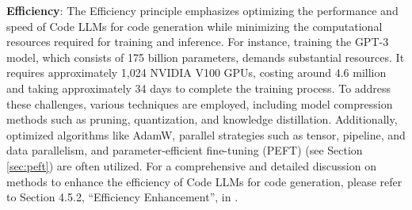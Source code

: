 \textbf{Efficiency}: 
The Efficiency principle emphasizes optimizing the performance and speed of Code LLMs for code generation while minimizing the computational resources required for training and inference. 
For instance, training the GPT-3 model, which consists of 175 billion parameters, demands substantial resources. It requires approximately 1,024 NVIDIA V100 GPUs, costing around $4.6$ million and taking approximately 34 days to complete the training process. 
To address these challenges, various techniques are employed, including model compression methods such as pruning, quantization, and knowledge distillation. Additionally, optimized algorithms like AdamW, parallel strategies such as tensor, pipeline, and data parallelism, and parameter-efficient fine-tuning (PEFT) (see Section \ref{sec:peft}) are often utilized. 
For a comprehensive and detailed discussion on methods to enhance the efficiency of Code LLMs for code generation, please refer to Section 4.5.2, ``Efficiency Enhancement'', in \cite{yang2024robustness}.

